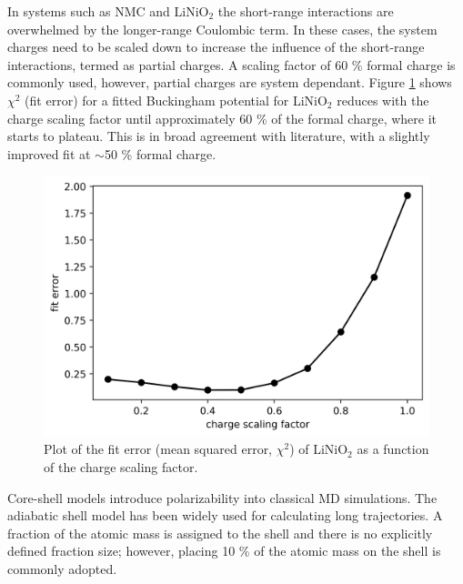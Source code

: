 \documentclass[journal=jacsat,manuscript=article]{achemso}
\begin{document}
In systems such as NMC and LiNiO$_2$ the short-range interactions are overwhelmed by the longer-range Coulombic term. 
In these cases, the system charges need to be scaled down to increase the influence of the short-range interactions, termed as partial charges. 
A scaling factor of 60 \% formal charge is commonly used, \cite{pedone2006potentials} however, partial charges are system dependant. 
Figure \ref{fig:charge_scaling} shows $\chi^2$ (fit error) for a fitted Buckingham potential for LiNiO$_2$ reduces with the charge scaling factor until approximately 60 \% of the formal charge, where it starts to plateau. This is in broad agreement with literature, with a slightly improved fit at $\sim$50 \% formal charge.

\begin{figure}[h]
    \centering
    \includegraphics[scale=0.65]{Figures/charge_scaling_error_plot.png}
    \caption{\label{fig:charge_scaling} Plot of the fit error (mean squared error, $\chi^2$) of LiNiO$_2$ as a function of the charge scaling factor.}
\end{figure}

Core-shell models introduce polarizability into classical MD simulations. The adiabatic shell model \cite{Mitchell_1993} has been widely used for calculating long trajectories. 
A fraction of the atomic mass is assigned to the shell and there is no explicitly defined fraction size; however, placing 10 \% of the atomic mass on the shell is commonly adopted. \cite{PLIMPTON19951,todorov2006dl_poly_3} 
\end{document}
